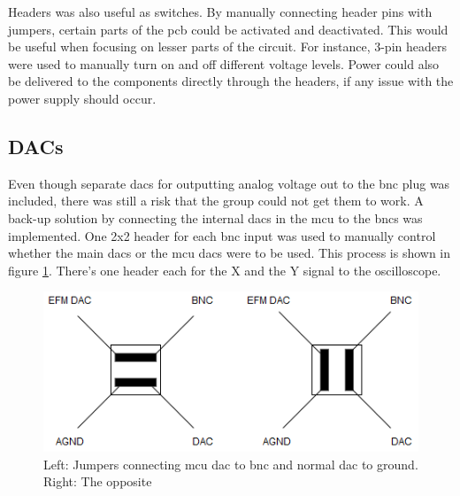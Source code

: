 Headers was also useful as switches.
By manually connecting header pins with jumpers, certain parts of the \gls{pcb} could be activated and deactivated.
This would be useful when focusing on lesser parts of the circuit.
For instance, 3-pin headers were used to manually turn on and off different voltage levels.
Power could also be delivered to the components directly through the headers, if any issue with the power supply should occur.

\subsection{DACs}
Even though separate \gls{dac}s for outputting analog voltage out to the \gls{bnc} plug was included, there was still a risk that the group could not get them to work.
A back-up solution by connecting the internal \gls{dac}s in the \gls{mcu} to the \gls{bnc}s was implemented.
One 2x2 header for each \gls{bnc} input was used to manually control whether the main \gls{dac}s or the \gls{mcu} \gls{dac}s were to be used.
This process is shown in figure \ref{fig:DAC headers}.
There's one header each for the X and the Y signal to the oscilloscope.

\begin{figure}[h!]
\centering
\includegraphics[scale = 0.6]{images/DAC_headers.png}
\caption{Left: Jumpers connecting \gls{mcu} \gls{dac} to \gls{bnc} and normal \gls{dac} to ground. Right: The opposite}
\label{fig:DAC headers}
\end{figure}
